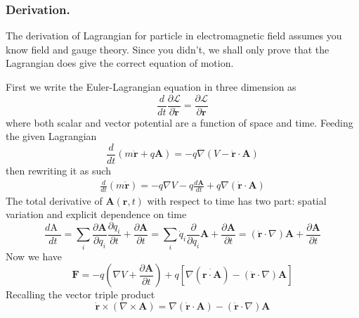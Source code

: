 \documentclass[../../../main.tex]{subfiles}
\begin{document}
\subsubsection{Derivation.}
The derivation of Lagrangian for particle in electromagnetic field assumes you know field and gauge theory.
Since you didn't, we shall only prove that the Lagrangian does give the correct equation of motion.

First we write the Euler-Lagrangian equation in three dimension as 
\begin{equation*}
	\frac{d }{dt }\frac{\partial \mathcal{L }}{\partial \dot{\mathbf{r}}}=\frac{\partial \mathcal{L }}{\partial \mathbf{r}}
\end{equation*}
where both scalar and vector potential are a function of space and time.
Feeding the given Lagrangian
\begin{equation*}
	\frac{d }{dt }\left( m \dot{\mathbf{r}}+q \mathbf{A} \right) =-q \nabla \left( V-\dot{\mathbf{r} }\cdot\mathbf{A} \right) 
\end{equation*}
then rewriting it as such
\begin{align*}
	\frac{d }{dt }\left( m \dot{\mathbf{r}} \right) =-q \nabla V-q \frac{d \mathbf{A }}{dt }+ q \nabla \left( \dot{\mathbf{r }}\cdot \mathbf{A} \right) 
\end{align*}
The total derivative of $\mathbf{A}(\mathbf{r },t)$ with respect to time has two part: spatial variation and explicit dependence on time
\begin{equation*}
	\frac{d\mbox{A }}{dt}=\sum_i \frac{\partial \mathbf{A }}{\partial q_i}\frac{\partial q_i }{\partial t }+\frac{\partial \mathbf{A }}{\partial t }=\sum_i \dot{q}_i \frac{\partial }{\partial q_i }\mathbf{A}+ \frac{\partial \mathbf{A }}{\partial t }= \left( \dot{\mathbf{r }}\cdot \nabla\right)\mathbf{A}+ \frac{\partial \mathbf{A }}{\partial t}
\end{equation*}
Now we have 
\begin{equation*}
	\mathbf{F }=-q \left( \nabla  V+\frac{\partial \mathbf{A }}{\partial t} \right) +q \left[ \nabla \left( \dot{\mathbf{r }\cdot \mathbf{A }} \right)-\left( \dot{\mathbf{r}}\cdot \nabla   \right)\mathbf{A}   \right] 
\end{equation*}
Recalling the vector triple product
\begin{equation*}
	\dot{\mathbf{r }}\times \left( \nabla \times \mathbf{A }  \right)=\nabla \left( \dot{\mathbf{r }}\cdot \mathbf{A} \right)  -\left( \dot{\mathbf{r }}\cdot \nabla   \right) \mathbf{A}
\end{equation*}
\end{document}
